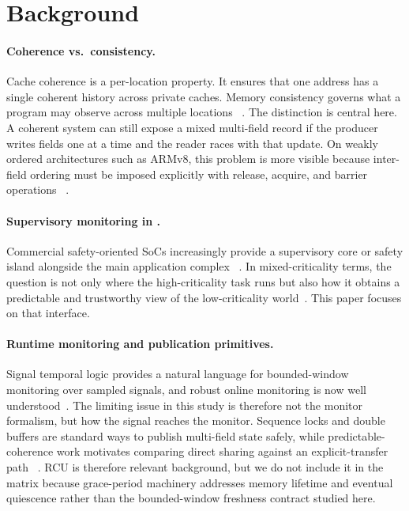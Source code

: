 \section{Background}
\label{sec:background}

\paragraph{Coherence vs.\ consistency.}
Cache coherence is a per-location property. It ensures that one address
has a single coherent history across private caches. Memory consistency
governs what a program may observe across multiple locations
~\cite{AdveGharachorloo1996,SorinHillWood2020Primer}. The distinction is
central here. A coherent system can still expose a mixed multi-field
record if the producer writes fields one at a time and the reader races
with that update. On weakly ordered architectures such as ARMv8, this
problem is more visible because inter-field ordering must be imposed
explicitly with release, acquire, and barrier operations
~\cite{Pulte2018SimplifyingARM,Flur2016ARMv8,Maranget2012Tutorial,%
ARMv8ARM}.

\paragraph{Supervisory monitoring in \CPS.}
Commercial safety-oriented SoCs increasingly provide a supervisory core
or safety island alongside the main application complex
~\cite{ArmAutoSolutionsOverview,NVIDIADriveFSI}. In mixed-criticality
terms, the question is not only where the high-criticality task runs but
also how it obtains a predictable and trustworthy view of the
low-criticality world~\cite{BurnsDavis2022MixedCrit,Kopetz2022RealTime}.
This paper focuses on that interface.

\paragraph{Runtime monitoring and publication primitives.}
Signal temporal logic provides a natural language for bounded-window
monitoring over sampled signals, and robust online monitoring is now
well understood~\cite{MalerNickovic2004,FainekosPappas2009,%
Deshmukh2017,Bartocci2018CPSMonitoring}. The limiting issue in this
study is therefore not the monitor formalism, but how the signal reaches
the monitor. Sequence locks and double buffers are standard ways to
publish multi-field state safely, while predictable-coherence work
motivates comparing direct sharing against an explicit-transfer path
~\cite{LamportSeqLock1977,Boehm2012Seqlocks,McKenney2019RCU,%
Hassan2017PredictableCoherence,Hassan2022IntegratingCOTSCoherence}.
RCU is therefore relevant background, but we do not include it in the
matrix because grace-period machinery addresses memory lifetime and
eventual quiescence rather than the bounded-window freshness contract
studied here.

